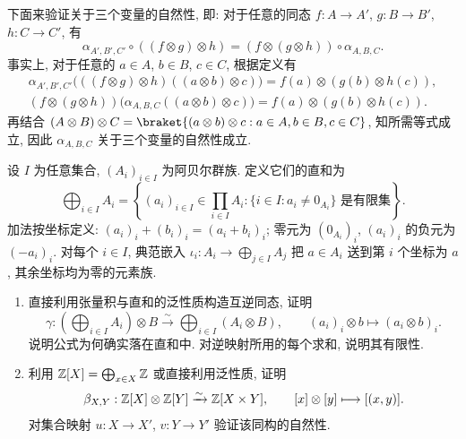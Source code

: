 \documentclass{article}
\begin{document}
\begin{solution}
	下面来验证关于三个变量的自然性, 即: 对于任意的同态 $f: A \to A'$, $g: B \to B'$, $h: C \to C'$, 有
	\[ \alpha_{A', B', C'} \circ ((f \otimes g) \otimes h) = (f \otimes (g \otimes h)) \circ \alpha_{A, B, C}. \]
	事实上, 对于任意的 $a \in A$, $b \in B$, $c \in C$, 根据定义有
	\begin{gather*}
		\alpha_{A', B', C'}\bigl(((f \otimes g) \otimes h)((a \otimes b) \otimes c)\bigr)
		= f(a) \otimes (g(b) \otimes h(c)), \\
		(f \otimes (g \otimes h))\bigl(\alpha_{A, B, C}((a \otimes b) \otimes c)\bigr)
		= f(a) \otimes (g(b) \otimes h(c)).
	\end{gather*}
	再结合 $(A \otimes B) \otimes C = \braket{(a \otimes b) \otimes c: a \in A, b \in B, c \in C}$, 知所需等式成立, 因此 $\alpha_{A, B, C}$ 关于三个变量的自然性成立.
\end{solution}



\begin{problem}
设 $I$ 为任意集合, $(A_i)_{i\in I}$ 为阿贝尔群族. 定义它们的直和为
\[
  \bigoplus_{i\in I}A_i
  =\left\{(a_i)_{i\in I}\in\prod_{i\in I}A_i:
    \{i\in I:a_i\ne0_{A_i}\}\text{ 是有限集}\right\}.
\]
加法按坐标定义: $(a_i)_i+(b_i)_i=(a_i+b_i)_i$; 零元为 $(0_{A_i})_i$, $(a_i)_i$ 的负元为 $(-a_i)_i$. 对每个 $i\in I$, 典范嵌入 $\iota_i:A_i\to\bigoplus_{j\in I}A_j$ 把 $a\in A_i$ 送到第 $i$ 个坐标为 $a$, 其余坐标均为零的元素族.
\begin{enumerate}
  \item[(a)] 直接利用张量积与直和的泛性质构造互逆同态, 证明
  \[
    \gamma:\left(\bigoplus_{i\in I}A_i\right)\otimes B
    \xrightarrow{\sim}\bigoplus_{i\in I}(A_i\otimes B),\qquad
    (a_i)_i\otimes b\longmapsto(a_i\otimes b)_i.
  \]
  说明公式为何确实落在直和中. 对逆映射所用的每个求和, 说明其有限性.
  \item[(b)] 利用 $\mathbb{Z}[X]=\bigoplus_{x\in X}\mathbb{Z}$ 或直接利用泛性质, 证明
  \[
    \beta_{X,Y}:\mathbb{Z}[X]\otimes\mathbb{Z}[Y]\xrightarrow{\sim}\mathbb{Z}[X\times Y],\qquad
    [x]\otimes[y]\longmapsto[(x,y)].
  \]
  对集合映射 $u:X\to X'$, $v:Y\to Y'$ 验证该同构的自然性.
\end{enumerate}
\end{problem}
\end{document}
